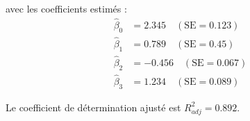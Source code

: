 avec les coefficients estimés :
\begin{align}
	\hat{\beta}_0 &= 2.345 \quad (\text{SE} = 0.123) \nonumber \\
	\hat{\beta}_1 &= 0.789 \quad (\text{SE} = 0.45) \nonumber \\
	\hat{\beta}_2 &= -0.456 \quad (\text{SE} = 0.067) \nonumber \\
	\hat{\beta}_3 &= 1.234 \quad(\text{SE} = 0.089) \nonumber
\end{align} 

Le coefficient de détermination ajusté est $R^2_{adj} = 0.892$.














